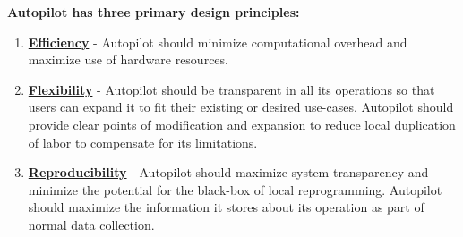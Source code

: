 \textbf{Autopilot has three primary design principles:}

\begin{enumerate}
    \item \hyperref[sec:efficiency]{\textbf{Efficiency}} - Autopilot should minimize computational overhead and maximize use of hardware resources.
    \item \hyperref[sec:flexibility]{\textbf{Flexibility}} - Autopilot should be transparent in all its operations so that users can expand it to fit their existing or desired use-cases. Autopilot should provide clear points of modification and expansion to reduce local duplication of labor to compensate for its limitations.
    \item \hyperref[sec:reproducibility]{\textbf{Reproducibility}} - Autopilot should maximize system transparency and minimize the potential for the black-box of local reprogramming. Autopilot should maximize the information it stores about its operation as part of normal data collection.
\end{enumerate}

